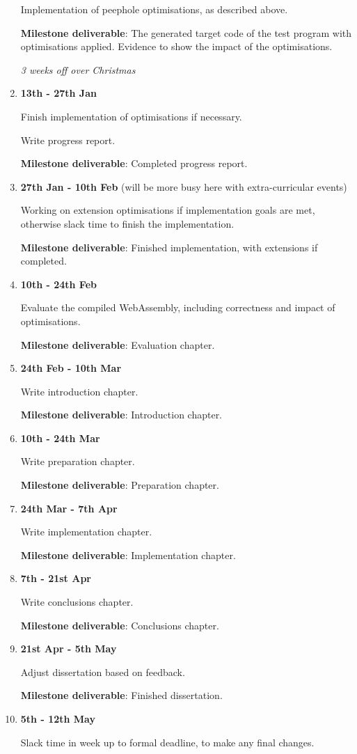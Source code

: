 \documentclass[12pt,a4paper]{article}
\begin{document}
\begin{enumerate}
  Implementation of peephole optimisations, as described above.

  \textbf{Milestone deliverable}: The generated target code of the test program with optimisations applied. Evidence to show the impact of the optimisations.

\textit{3 weeks off over Christmas}

\item\textbf{13th - 27th Jan}

  Finish implementation of optimisations if necessary.

  Write progress report.

  \textbf{Milestone deliverable}: Completed progress report.

\item \textbf{27th Jan - 10th Feb} (will be more busy here with extra-curricular events)

  Working on extension optimisations if implementation goals are met, otherwise slack time to finish the implementation.

  \textbf{Milestone deliverable}: Finished implementation, with extensions if completed.

\item\textbf{10th - 24th Feb}

  Evaluate the compiled WebAssembly, including correctness and impact of optimisations.

  \textbf{Milestone deliverable}: Evaluation chapter.

\item\textbf{24th Feb - 10th Mar}

  Write introduction chapter.

  \textbf{Milestone deliverable}: Introduction chapter.

\item\textbf{10th - 24th Mar}

  Write preparation chapter.

  \textbf{Milestone deliverable}: Preparation chapter.

\item\textbf{24th Mar - 7th Apr}

  Write implementation chapter.

  \textbf{Milestone deliverable}: Implementation chapter.

\item\textbf{7th - 21st Apr}

  Write conclusions chapter.

  \textbf{Milestone deliverable}: Conclusions chapter.

\item\textbf{21st Apr - 5th May}

  Adjust dissertation based on feedback.

  \textbf{Milestone deliverable}: Finished dissertation.

\item \textbf{5th - 12th May}

  Slack time in week up to formal deadline, to make any final changes.

\end{enumerate}
\end{document}
